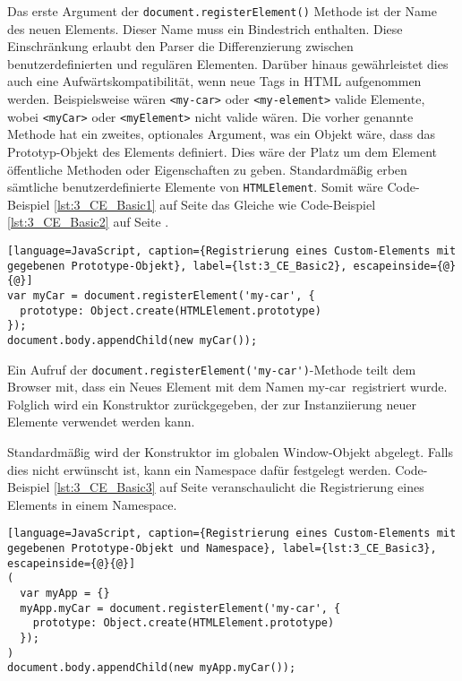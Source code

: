 Das erste Argument der \lstinline|document.registerElement()| Methode ist der Name des neuen Elements. Dieser Name muss ein Bindestrich enthalten. Diese Einschränkung erlaubt den Parser die Differenzierung zwischen benutzerdefinierten und regulären Elementen. Darüber hinaus gewährleistet dies auch eine Aufwärtskompatibilität, wenn neue Tags in HTML aufgenommen werden. Beispielsweise wären \lstinline|<my-car>| oder \lstinline|<my-element>| valide Elemente, wobei \lstinline|<myCar>| oder \lstinline|<myElement>| nicht valide wären. Die vorher genannte Methode hat ein zweites, optionales Argument, was ein Objekt wäre, dass das Prototyp-Objekt des Elements definiert. Dies wäre der Platz um dem Element öffentliche Methoden oder Eigenschaften zu geben. Standardmäßig erben sämtliche benutzerdefinierte Elemente von \lstinline|HTMLElement|. Somit wäre Code-Beispiel \ref{lst:3_CE_Basic1} auf Seite \pageref{lst:3_CE_Basic1} das Gleiche wie Code-Beispiel \ref{lst:3_CE_Basic2} auf Seite \pageref{lst:3_CE_Basic2}.

\begin{lstlisting}[language=JavaScript, caption={Registrierung eines Custom-Elements mit gegebenen Prototype-Objekt}, label={lst:3_CE_Basic2}, escapeinside={@}{@}]
var myCar = document.registerElement('my-car', {
  prototype: Object.create(HTMLElement.prototype)
});
document.body.appendChild(new myCar());
\end{lstlisting}

Ein Aufruf der \lstinline|document.registerElement('my-car')|-Methode teilt dem Browser mit, dass ein Neues Element mit dem Namen \glqq my-car\grqq\ registriert wurde. Folglich wird ein Konstruktor zurückgegeben, der zur Instanziierung neuer Elemente verwendet werden kann.

Standardmäßig wird der Konstruktor im globalen Window-Objekt abgelegt. Falls dies nicht erwünscht ist, kann ein Namespace dafür festgelegt werden. Code-Beispiel \ref{lst:3_CE_Basic3} auf Seite \pageref{lst:3_CE_Basic3} veranschaulicht die Registrierung eines Elements in einem Namespace.

\begin{lstlisting}[language=JavaScript, caption={Registrierung eines Custom-Elements mit gegebenen Prototype-Objekt und Namespace}, label={lst:3_CE_Basic3}, escapeinside={@}{@}]
(
  var myApp = {}
  myApp.myCar = document.registerElement('my-car', {
    prototype: Object.create(HTMLElement.prototype)
  });
)
document.body.appendChild(new myApp.myCar());
\end{lstlisting}


